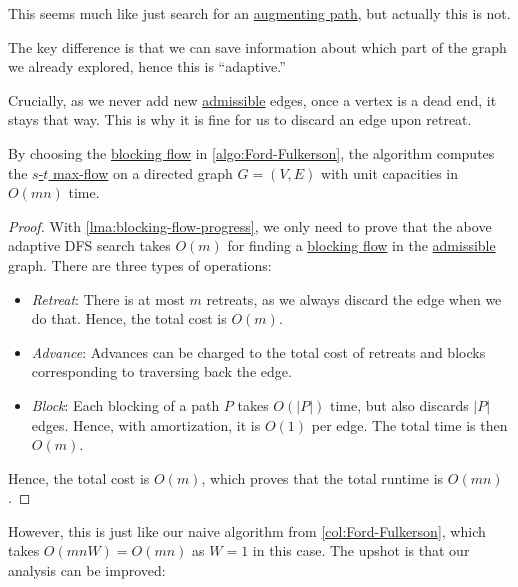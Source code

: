 This seems much like just search for an \hyperref[def:augmenting-path]{augmenting path}, but actually this is not.

\begin{intuition}
	The key difference is that we can save information about which part of the graph we already explored, hence this is ``adaptive.''
\end{intuition}

Crucially, as we never add new \hyperref[def:admissible]{admissible} edges, once a vertex is a dead end, it stays that way. This is why it is fine for us to discard an edge upon retreat.

\begin{theorem}\label{thmj:Ford-Fulkerson-blocking-flow-unit}
	By choosing the \hyperref[def:blocking-flow]{blocking flow} in \autoref{algo:Ford-Fulkerson}, the algorithm computes the \hyperref[prb:s-t-max-flow]{\(s\)-\(t\) max-flow} on a directed graph \(G = (V, E)\) with unit capacities in \(O(mn)\) time.
\end{theorem}
\begin{proof}
	With \autoref{lma:blocking-flow-progress}, we only need to prove that the above adaptive DFS search takes \(O(m)\) for finding a \hyperref[def:blocking-flow]{blocking flow} in the \hyperref[def:admissible]{admissible} graph. There are three types of operations:
	\begin{itemize}
		\item \emph{Retreat}: There is at most \(m\) retreats, as we always discard the edge when we do that. Hence, the total cost is \(O(m)\).
		\item \emph{Advance}: Advances can be charged to the total cost of retreats and blocks corresponding to traversing back the edge.
		\item \emph{Block}: Each blocking of a path \(P\) takes \(O(\lvert P \rvert )\) time, but also discards \(\lvert P \rvert \) edges. Hence, with amortization, it is \(O(1)\) per edge. The total time is then \(O(m)\).
	\end{itemize}
	Hence, the total cost is \(O(m)\), which proves that the total runtime is \(O(mn)\).
\end{proof}

However, this is just like our naive algorithm from \autoref{col:Ford-Fulkerson}, which takes \(O(mnW) = O(mn)\) as \(W = 1\) in this case. The upshot is that our analysis can be improved:

